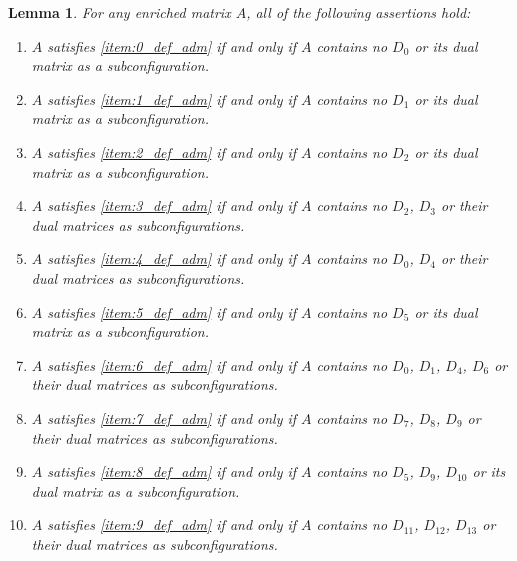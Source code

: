 \documentclass[12pt]{book}
\theoremstyle{plain}
\newtheorem{lema}[teo]{Lemma}
\theoremstyle{remark}
\begin{document}
\begin{lema}
	For any enriched matrix $A$, all of the following assertions hold:
	\begin{enumerate}
		\item $A$ satisfies \ref{item:0_def_adm} if and only if $A$ contains no $D_0$ or its dual matrix as a subconfiguration.
		\item $A$ satisfies \ref{item:1_def_adm} if and only if $A$ contains no $D_1$ or its dual matrix as a subconfiguration.
		\item $A$ satisfies \ref{item:2_def_adm} if and only if $A$ contains no $D_2$ or its dual matrix as a subconfiguration.
		\item $A$ satisfies \ref{item:3_def_adm} if and only if $A$ contains no $D_2$, $D_3$ or their dual matrices as subconfigurations.
		\item $A$ satisfies \ref{item:4_def_adm} if and only if $A$ contains no $D_0$, $D_4$ or their dual matrices as subconfigurations.
		\item $A$ satisfies \ref{item:5_def_adm} if and only if $A$ contains no $D_5$ or its dual matrix as a subconfiguration.
		\item $A$ satisfies \ref{item:6_def_adm} if and only if $A$ contains no $D_0$, $D_1$, $D_4$, $D_6$ or their dual matrices as subconfigurations.
		\item $A$ satisfies \ref{item:7_def_adm} if and only if $A$ contains no $D_7$, $D_8$, $D_9$ or their dual matrices as subconfigurations.		
		\item $A$ satisfies \ref{item:8_def_adm} if and only if $A$ contains no $D_5$, $D_9$, $D_{10}$ or its dual matrix as a subconfiguration.		
		\item $A$ satisfies \ref{item:9_def_adm} if and only if $A$ contains no $D_{11}$, $D_{12}$, $D_{13}$ or their dual matrices as subconfigurations.	
	\end{enumerate}
\end{lema}
\end{document}
